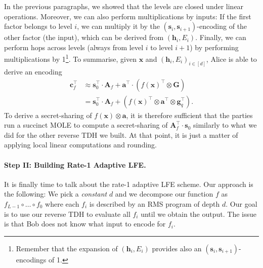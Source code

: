 \documentclass{article}
\begin{document}
In the previous paragraphs, we showed that the levels are closed under linear operations. Moreover, we can also perform multiplications by inputs: If the first factor belongs to level $i$, we can multiply it by the $(\mathbf{s}_i, \mathbf{s}_{i+1})$-encoding of the other factor (the input), which can be derived from $(\mathbf{h}_i, E_i)$. Finally, we can perform hops across levels (always from level $i$ to level $i+1$) by performing multiplications by 1\footnote{Remember that the expansion of $(\mathbf{h}_i, E_i)$ provides also an $(\mathbf{s}_i, \mathbf{s}_{i+1})$-encodings of 1.}. To summarise, given $\mathbf{x}$ and $(\mathbf{h}_i, E_i)_{i\in[d]}$, Alice is able to derive an encoding
\begin{align*}
    \mathbf{c}_f^\intercal&\approx \mathbf{s}_0^\intercal \cdot \mathbf{A}_f+\mathbf{a}^\intercal \cdot (f(\mathbf{x})^\intercal \otimes \mathbf{G})\\
    &=\mathbf{s}_0^\intercal \cdot \mathbf{A}_f+ (f(\mathbf{x})^\intercal \otimes \mathbf{a}^\intercal\otimes \mathbf{g}_q^\intercal).
\end{align*}
To derive a secret-sharing of $f(\mathbf{x}) \otimes \mathbf{a}$, it is therefore sufficient that the parties run a succinct MOLE to compute a secret-sharing of $\mathbf{A}_f^\intercal\cdot \mathbf{s}_0$ similarly to what we did for the other reverse TDH we built. At that point, it is just a matter of applying local linear computations and rounding.

\paragraph{Step II: Building Rate-1 Adaptive LFE.} It is finally time to talk about the rate-1 adaptive LFE scheme. Our approach is the following: We pick a \emph{constant} $d$ and we decompose our function $f$ as $f_{L-1}\circ\dots\circ f_0$ where each $f_i$ is described by an RMS program of depth $d$. Our goal is to use our reverse TDH to evaluate all $f_i$ until we obtain the output. The issue is that Bob does not know what input to encode for $f_i$. 
\end{document}

